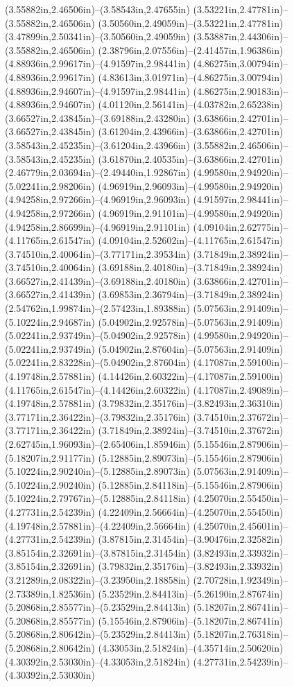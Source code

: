 (3.55882in,2.46506in)--(3.58543in,2.47655in) (3.53221in,2.47781in)--(3.55882in,2.46506in) (3.50560in,2.49059in)--(3.53221in,2.47781in) (3.47899in,2.50341in)--(3.50560in,2.49059in) (3.53887in,2.44306in)--(3.55882in,2.46506in) (2.38796in,2.07556in)--(2.41457in,1.96386in) (4.88936in,2.99617in)--(4.91597in,2.98441in) (4.86275in,3.00794in)--(4.88936in,2.99617in) (4.83613in,3.01971in)--(4.86275in,3.00794in) (4.88936in,2.94607in)--(4.91597in,2.98441in) (4.86275in,2.90183in)--(4.88936in,2.94607in) (4.01120in,2.56141in)--(4.03782in,2.65238in) (3.66527in,2.43845in)--(3.69188in,2.43280in) (3.63866in,2.42701in)--(3.66527in,2.43845in) (3.61204in,2.43966in)--(3.63866in,2.42701in) (3.58543in,2.45235in)--(3.61204in,2.43966in) (3.55882in,2.46506in)--(3.58543in,2.45235in) (3.61870in,2.40535in)--(3.63866in,2.42701in) (2.46779in,2.03694in)--(2.49440in,1.92867in) (4.99580in,2.94920in)--(5.02241in,2.98206in) (4.96919in,2.96093in)--(4.99580in,2.94920in) (4.94258in,2.97266in)--(4.96919in,2.96093in) (4.91597in,2.98441in)--(4.94258in,2.97266in) (4.96919in,2.91101in)--(4.99580in,2.94920in) (4.94258in,2.86699in)--(4.96919in,2.91101in) (4.09104in,2.62775in)--(4.11765in,2.61547in) (4.09104in,2.52602in)--(4.11765in,2.61547in) (3.74510in,2.40064in)--(3.77171in,2.39534in) (3.71849in,2.38924in)--(3.74510in,2.40064in) (3.69188in,2.40180in)--(3.71849in,2.38924in) (3.66527in,2.41439in)--(3.69188in,2.40180in) (3.63866in,2.42701in)--(3.66527in,2.41439in) (3.69853in,2.36794in)--(3.71849in,2.38924in) (2.54762in,1.99874in)--(2.57423in,1.89388in) (5.07563in,2.91409in)--(5.10224in,2.94687in) (5.04902in,2.92578in)--(5.07563in,2.91409in) (5.02241in,2.93749in)--(5.04902in,2.92578in) (4.99580in,2.94920in)--(5.02241in,2.93749in) (5.04902in,2.87604in)--(5.07563in,2.91409in) (5.02241in,2.83228in)--(5.04902in,2.87604in) (4.17087in,2.59100in)--(4.19748in,2.57881in) (4.14426in,2.60322in)--(4.17087in,2.59100in) (4.11765in,2.61547in)--(4.14426in,2.60322in) (4.17087in,2.49089in)--(4.19748in,2.57881in) (3.79832in,2.35176in)--(3.82493in,2.36310in) (3.77171in,2.36422in)--(3.79832in,2.35176in) (3.74510in,2.37672in)--(3.77171in,2.36422in) (3.71849in,2.38924in)--(3.74510in,2.37672in) (2.62745in,1.96093in)--(2.65406in,1.85946in) (5.15546in,2.87906in)--(5.18207in,2.91177in) (5.12885in,2.89073in)--(5.15546in,2.87906in) (5.10224in,2.90240in)--(5.12885in,2.89073in) (5.07563in,2.91409in)--(5.10224in,2.90240in) (5.12885in,2.84118in)--(5.15546in,2.87906in) (5.10224in,2.79767in)--(5.12885in,2.84118in) (4.25070in,2.55450in)--(4.27731in,2.54239in) (4.22409in,2.56664in)--(4.25070in,2.55450in) (4.19748in,2.57881in)--(4.22409in,2.56664in) (4.25070in,2.45601in)--(4.27731in,2.54239in) (3.87815in,2.31454in)--(3.90476in,2.32582in) (3.85154in,2.32691in)--(3.87815in,2.31454in) (3.82493in,2.33932in)--(3.85154in,2.32691in) (3.79832in,2.35176in)--(3.82493in,2.33932in) (3.21289in,2.08322in)--(3.23950in,2.18858in) (2.70728in,1.92349in)--(2.73389in,1.82536in) (5.23529in,2.84413in)--(5.26190in,2.87674in) (5.20868in,2.85577in)--(5.23529in,2.84413in) (5.18207in,2.86741in)--(5.20868in,2.85577in) (5.15546in,2.87906in)--(5.18207in,2.86741in) (5.20868in,2.80642in)--(5.23529in,2.84413in) (5.18207in,2.76318in)--(5.20868in,2.80642in) (4.33053in,2.51824in)--(4.35714in,2.50620in) (4.30392in,2.53030in)--(4.33053in,2.51824in) (4.27731in,2.54239in)--(4.30392in,2.53030in) 